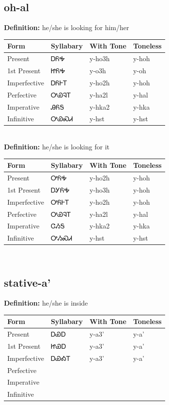 \documentclass{article}%
\begin{document}
\subsection*{oh-al}%
\textbf{Definition: }%
he/she is looking for him/her%
\\[0.5em]%
\begin{tabular}{|l|l|l|l|}%
\hline%
\textbf{Form}&\textbf{Syllabary}&\textbf{With Tone}&\textbf{Toneless}\\%
\hline%
Present&ᎠᏲᎭ&y{-}ho3h&y{-}hoh\\%
1st Present&ᏥᏲᎭ&y{-}o3h&y{-}oh\\%
Imperfective&ᎠᏲᎰᎢ&y{-}ho2h&y{-}hoh\\%
Perfective&ᎤᏯᎸᎢ&y{-}ha2l&y{-}hal\\%
Imperative&ᎯᏲᎦ&y{-}hka2&y{-}hka\\%
Infinitive&ᎤᏯᏍᏗ&y{-}hst&y{-}hst\\%
\hline%
\end{tabular}%
\\[1em]%
\textbf{Definition: }%
he/she is looking for it%
\\[0.5em]%
\begin{tabular}{|l|l|l|l|}%
\hline%
\textbf{Form}&\textbf{Syllabary}&\textbf{With Tone}&\textbf{Toneless}\\%
\hline%
Present&ᎤᏲᎭ&y{-}ho2h&y{-}hoh\\%
1st Present&ᎠᎩᏲᎭ&y{-}ho3h&y{-}hoh\\%
Imperfective&ᎤᏲᎰᎢ&y{-}ho2h&y{-}hoh\\%
Perfective&ᎤᏯᎸᎢ&y{-}ha2l&y{-}hal\\%
Imperative&ᏣᏱᎦ&y{-}hka2&y{-}hka\\%
Infinitive&ᎤᏱᏍᏗ&y{-}hst&y{-}hst\\%
\hline%
\end{tabular}%
\\[1em]%
\subsection*{stative-a'}%
\textbf{Definition: }%
he/she is inside%
\\[0.5em]%
\begin{tabular}{|l|l|l|l|}%
\hline%
\textbf{Form}&\textbf{Syllabary}&\textbf{With Tone}&\textbf{Toneless}\\%
\hline%
Present&ᎠᏯᎠ&y{-}a3'&y{-}a'\\%
1st Present&ᏥᏯᎠ&y{-}a3'&y{-}a'\\%
Imperfective&ᎠᏯᎣᎢ&y{-}a3'&y{-}a'\\%
Perfective&&&\\%
Imperative&&&\\%
Infinitive&&&\\%
\hline%
\end{tabular}%
\\[1em]%
\end{document}
